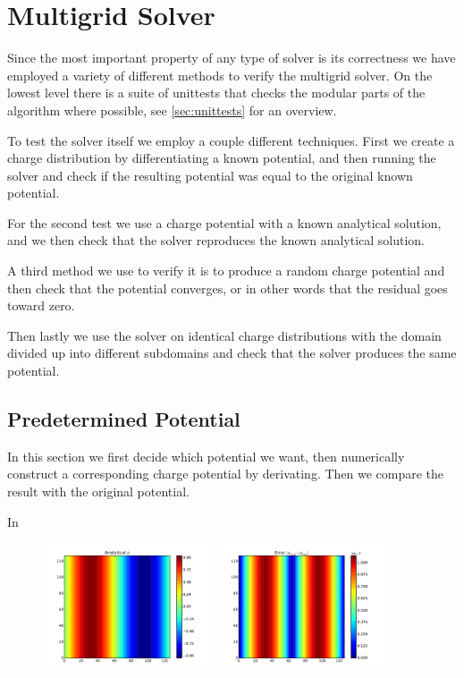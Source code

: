 \section{Multigrid Solver}
	Since the most important property of any type of solver is its correctness we have
	employed a variety of different methods to verify the multigrid solver.
	On the lowest level there is a suite of unittests that checks the modular parts
	of the algorithm where possible, see \cref{sec:unittests} for an overview.

	To test the solver itself we employ a couple different techniques. First we
	create a charge distribution by differentiating a known potential, and then
	running the solver and check if the resulting potential was equal to the original
	known potential.

	For the second test we use a charge potential with a known analytical solution,
	and we then check that the solver reproduces the known analytical solution.

	A third method we use to verify it is to produce a random charge potential
	and then check that the potential converges, or in other words
	that the residual goes toward zero.

	Then lastly we use the solver on identical charge distributions with the domain
	divided up into different subdomains and check that the solver produces the same
	potential.

\subsection{Predetermined Potential}
		In this section we first decide which potential we want, then numerically
		construct a corresponding charge potential by derivating. Then we compare the
		result with the original potential.

		In

		\begin{figure}
			\centering
			\includegraphics[width = 0.45\textwidth]{figures/verification/sinusoidal/analytical.pdf}
			\includegraphics[width = 0.45\textwidth]{figures/verification/sinusoidal/error.pdf}
		\end{figure}


